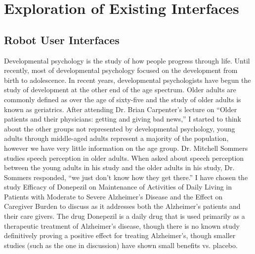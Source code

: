 \chapter{Exploration of Existing Interfaces}
\label{cpt:background}
\section{Robot User Interfaces}

Developmental psychology is the study of how people progress through life.  Until recently, most of developmental psychology focused on the development from birth to adolescence.  In recent years, developmental psychologists have begun the study of development at the other end of the age spectrum.   Older adults are commonly defined as over the age of sixty-five and the study of older adults is known as geriatrics.  After attending Dr. Brian Carpenter’s lecture on “Older patients and their physicians: getting and giving bad news,” I started to think about the other groups not represented by developmental psychology, young adults through middle-aged adults represent a majority of the population, however we have very little information on the age group.  Dr. Mitchell Sommers studies speech perception in older adults.  When asked about speech perception between the young adults in his study and the older adults in his study, Dr. Sommers responded, “we just don’t know how they get there.”  
I have chosen the study Efficacy of Donepezil on Maintenance of Activities of Daily Living in Patients with Moderate to Severe Alzheimer’s Disease and the Effect on Caregiver Burden to discuss as it addresses both the Alzheimer’s patients and their care givers. The drug Donepezil is a daily drug that is used primarily as a therapeutic treatment of Alzheimer’s disease, though there is no known study definitively proving a positive effect for treating Alzheimer’s, though smaller studies (such as the one in discussion) have shown small benefits vs. placebo.

